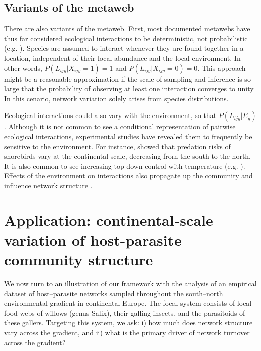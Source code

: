 \documentclass[12pt]{article}
\begin{document}
\subsection*{Variants of the metaweb}

There are also variants of the metaweb. First, most documented metawebs have
thus far considered ecological interactions to be deterministic, not
probabilistic (e.g. \citealt{Havens1992, Wood2015}). Species are assumed to
interact whenever they are found together in a location, independent of their
local abundance and the local environment. In other words,
$P(L_{ijy}|X_{ijy}=1) = 1$ and $P(L_{ijy}|X_{ijy}=0) = 0$. This approach might
be a reasonable approximation if the scale of sampling and inference is so
large that the probability of observing at least one interaction converges to
unity In this cenario, network variation solely arises from species
distributions.

Ecological interactions could also vary with the environment, so that $P(L_{ijy}
|E_y)$. Although it is not common to see a conditional representation of
pairwise ecological interactions, experimental studies have revealed them to
frequently be sensitive to the environment. For instance, \citep{Mckinnon2010} showed
that predation risks of shorebirds vary at the continental scale, decreasing
from the south to the north. It is also common to see increasing top-down
control with temperature (e.g. \citealt{Shurin2012, Gray2016}). Effects of the
environment on interactions also propagate up the community and influence network
structure \citep{Tylianakis2007, Woodward2010; Petchey2010; Lelong2015}.


\section*{Application: continental-scale variation of host-parasite community structure}

We now turn to an illustration of our framework with the analysis of an
empirical dataset of host–parasite networks sampled throughout the south–north
environmental gradient in continental Europe. The focal system consists of
local food webs of willows (genus Salix), their galling insects, and the
parasitoids of these gallers. Targeting this system, we ask: i) how much does
network structure vary across the gradient, and ii) what is the primary driver
of network turnover across the gradient?
\end{document}
